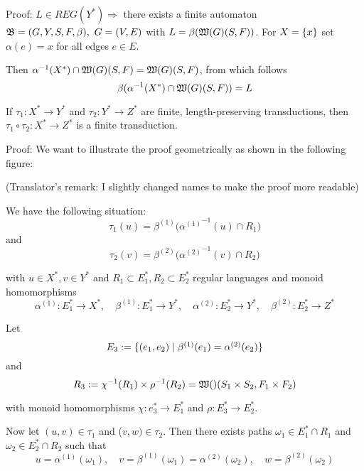 Proof: $L \in REG(Y^*) \Rightarrow$ there exists a finite automaton $\mbox{$\mathfrak{B}$} =
(G, Y, S, F, \beta),\ G= (V, E)$ with $L = \beta(\mbox{$\mathfrak{W}(G)$}(S, F))$. For $X =
\mbox{$\{x\}$}$ set $\alpha(e) = x$ for all edges $e \in E$.

Then $\alpha^{-1}(X^*) \cap \mbox{$\mathfrak{W}(G)$}(S, F) = \mbox{$\mathfrak{W}(G)$}(S, F)$, from which
follows \[\beta(\alpha^{-1}(X^*) \cap \mbox{$\mathfrak{W}(G)$}(S, F)) = L\]

\begin{theorem}
If $\tau_1 : X^* \to Y^*$ and $\tau_2 : Y^* \to Z^*$ are finite,
length-preserving transductions, then $\tau_1 \circ \tau_2 : X^* \to Z^*$ is a
finite transduction.
\end{theorem}

Proof: We want to illustrate the proof geometrically as shown in the following
figure:

\begin{center}
\end{center}

(Translator's remark: I slightly changed names to make the proof more readable)

We have the following situation:
\[ \tau_1(u) = \beta^{(1)}\big( {\alpha^{(1)}}^{-1}(u) \cap R_1 \big) \]
and
\[ \tau_2(v) = \beta^{(2)}\big( {\alpha^{(2)}}^{-1}(v) \cap R_2 \big) \]

with $u \in X^*, v \in Y^*$ and $R_1 \subset E_1^*, R_2 \subset E_2^*$ regular
languages and monoid homomorphisms
\[ \alpha^{(1)} : E_1^* \to X^*,\quad \beta^{(1)} : E_1^* \to
Y^*,\quad \alpha^{(2)} : E_2^* \to Y^*,\quad \beta^{(2)} : E_2^* \to Z^* \]

Let
\[ E_3 := \mbox{$\{(e_1, e_2) \mid \beta^{(1)}(e_1) = \alpha^{(2)}(e_2)\}$} \]
and 
\[ R_3 := \chi^{-1}(R_1) \times \rho^{-1}(R_2) = \mbox{$\mathfrak{W}()$}(S_1 \times S_2, F_1
\times F_2) \]

with monoid homomorphisms $\chi: e_3^* \to E_1^*$ and $\rho: E_3^* \to E_2^*$.

Now let $(u, v) \in \tau_1$ and ($v, w) \in \tau_2$. Then there exists paths
$\omega_1 \in E_1^* \cap R_1$ and $\omega_2 \in E_2^* \cap R_2$ such that 
\[ u = \alpha^{(1)}(\omega_1),\quad v = \beta^{(1)}(\omega_1) =
\alpha^{(2)}(\omega_2),\quad w = \beta^{(2)}(\omega_2) \]

